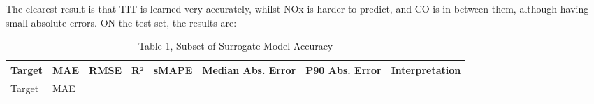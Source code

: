 \documentclass[11pt]{article}
\begin{document}
The clearest result is that TIT is learned very accurately, whilst NOx
is harder to predict, and CO is in between them, although having small
absolute errors. ON the test set, the results are:

\begin{longtable}[]{@{}
  >{\raggedright\arraybackslash}p{}
  >{\centering\arraybackslash}p{}
  >{\centering\arraybackslash}p{}
  >{\centering\arraybackslash}p{}
  >{\centering\arraybackslash}p{}
  >{\centering\arraybackslash}p{}
  >{\centering\arraybackslash}p{}
  >{\raggedright\arraybackslash}p{}@{}}
\caption{Table 1, Subset of Surrogate Model Accuracy}\tabularnewline
\toprule\noalign{}
\begin{minipage}[b]{\linewidth}\raggedright
Target
\end{minipage} & \begin{minipage}[b]{\linewidth}\centering
MAE
\end{minipage} & \begin{minipage}[b]{\linewidth}\centering
RMSE
\end{minipage} & \begin{minipage}[b]{\linewidth}\centering
R²
\end{minipage} & \begin{minipage}[b]{\linewidth}\centering
sMAPE
\end{minipage} & \begin{minipage}[b]{\linewidth}\centering
Median Abs. Error
\end{minipage} & \begin{minipage}[b]{\linewidth}\centering
P90 Abs. Error
\end{minipage} & \begin{minipage}[b]{\linewidth}\raggedright
Interpretation
\end{minipage} \\
\midrule\noalign{}
\endfirsthead
\toprule\noalign{}
\begin{minipage}[b]{\linewidth}\raggedright
Target
\end{minipage} & \begin{minipage}[b]{\linewidth}\centering
MAE
\end{minipage} & \begin{minipage}[b]{\linewidth}\centering

\end{minipage}
\end{longtable}
\end{document}
